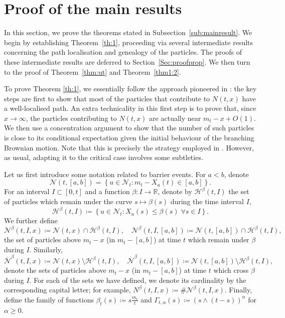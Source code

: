 \documentclass{article}
\newcommand{\nB}[2]{\mathcal{N}^{#1}(#2)}
\newcommand{\nOB}[2]{\overline{\mathcal{N}}^{#1}(#2)}
\newcommand{\NB}[2]{N^{#1}(#2)}
\begin{document}
\section{Proof of the main results}\label{sec:proofff}
In this section, we prove the theorems stated in Subsection~\ref{sub:mainresult}. We begin by establishing Theorem~\ref{th:1}, proceeding via several intermediate results concerning the path localisation and genealogy of the particles. The proofs of these intermediate results are deferred to Section~\ref{Sec:proofprop}. We then turn to the proof of Theorem~\ref{thm:ut} and Theorem~\ref{thm1:2}.

To prove Theorem \ref{th:1}, we essentially follow the approach pioneered in \cite{arguin2012ergodic}: the key steps are first to show that most of the particles that contribute to $N(t,x)$ have a well-localised path. An extra technicality in this first step is to prove that, since $x\to \infty$, the particles contributing to $N(t,x)$ are actually near $m_t -x +O(1)$. We then use a concentration argument to show that the number of such particles is close to its conditional expectation given the initial behaviour of the branching Brownian motion. Note that this is precisely the strategy employed in \cite{glenz2017mckeans}. However, as usual, adapting it to the critical case involves some subtleties.

Let us first introduce some notation related to barrier events. For $a<b$, denote
\[
\mathcal{N}(t,[a,b]) = \left\{u \in \mathcal{N}_t: m_t - X_u(t) \in [a,b] \right\}.
\]
For an interval $I \subset [0,t]$ and a function $\beta \colon I \to \mathbb{R}$, denote by $\mathcal{H}^\beta(t,I)$ the set of particles which remain under the curve $s \mapsto \beta(s)$ during the time interval $I$,
\[
\mathcal{H}^\beta(t,I) \coloneqq \left\{u\in \mathcal{N}_t : X_u(s)\leq \beta(s) \; \forall s \in I \right\}.
\]
We further define
\[
\nB{\beta}{t, I,x} \coloneqq \mathcal{N}(t,x) \cap \mathcal{H}^\beta(t, I), \quad
\nB{\beta}{t, I,[a,b]} \coloneqq \mathcal{N}(t,[a,b]) \cap \mathcal{H}^\beta(t, I),
\]
the set of particles above $m_t - x$ (in $m_t - [a,b]$) at time $t$ which remain under $\beta$ during $I$. Similarly,
\[
\nOB{\beta}{t,I,x} \coloneqq \mathcal{N}(t,x) \setminus \mathcal{H}^\beta(t,I), \quad
\nOB{\beta}{t,I,[a,b]} \coloneqq \mathcal{N}(t,[a,b]) \setminus \mathcal{H}^\beta(t,I),
\]
denote the sets of particles above $m_t - x$ (in $m_t - [a,b]$) at time $t$ which cross $\beta$ during $I$. For each of the sets we have defined, we denote its cardinality by the corresponding capital letter; for example, $\NB{\beta}{t, I,x} \coloneqq \#\nB{\beta}{t, I,x}$. Finally, define the family of functions $\beta_t(s) \coloneqq s\frac{m_t}{t}$ and $\Gamma_{t,\alpha}(s) \coloneqq (s \wedge (t-s))^\alpha$ for $\alpha \geq 0$.\\
\end{document}
